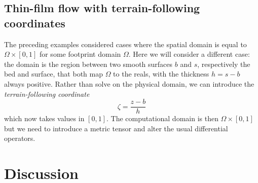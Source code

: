 \documentclass{article}
\theoremstyle{definition}
\theoremstyle{plain}
\begin{document}
\subsection{Thin-film flow with terrain-following coordinates}

The preceding examples considered cases where the spatial domain is equal to $\Omega \times [0, 1]$ for some footprint domain $\Omega$.
Here we will consider a different case: the domain is the region between two smooth surfaces $b$ and $s$, respectively the bed and surface, that both map $\Omega$ to the reals, with the thickness $h = s - b$ always positive.
Rather than solve on the physical domain, we can introduce the \emph{terrain-following coordinate}
\begin{equation}
    \zeta = \frac{z - b}{h}
\end{equation}
which now takes values in $[0, 1]$.
The computational domain is then $\Omega \times [0, 1]$ but we need to introduce a metric tensor and alter the usual differential operators.



\section{Discussion}

\pagebreak



\end{document}
